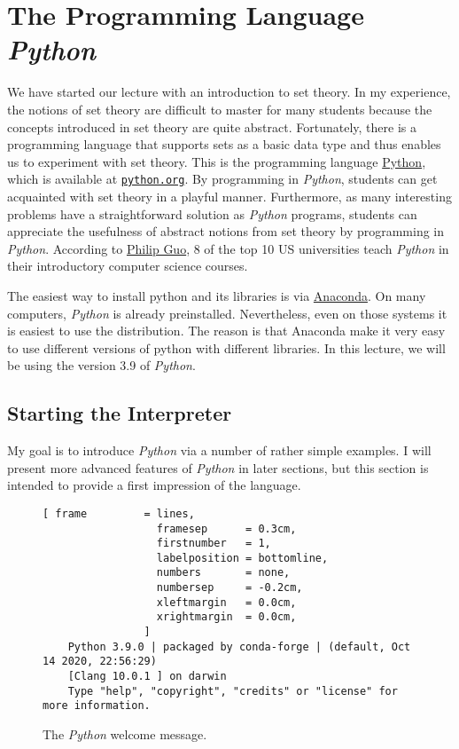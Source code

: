 \chapter{The Programming Language \textsl{Python}}
We have started our lecture with an introduction to set theory.  In my experience, the notions of
set theory are difficult to master for many students because the concepts introduced in set theory
are quite abstract.  Fortunately, there is a programming language that supports sets as a basic data type and
thus enables us to experiment with set theory.  This is the programming language
\href{https://en.wikipedia.org/wiki/Python_(programming_language)}{Python}, which is available at
\href{http://www.python.org}{\texttt{python.org}}. 
By programming in \textsl{Python}, students can get acquainted with set theory in a playful manner.
Furthermore, as many interesting problems have a straightforward solution as \textsl{Python} programs,
students can appreciate the usefulness of abstract notions from set theory by programming in \textsl{Python}.
According to 
\href{https://cacm.acm.org/blogs/blog-cacm/176450-python-is-now-the-most-popular-introductory-teaching-language-at-top-u-s-universities/fulltext}{Philip Guo},
8 of the top 10 US universities teach \textsl{Python} in their introductory computer science courses.

The easiest way to install python and its libraries is via \href{https://www.anaconda.com/download/}{Anaconda}.
On many computers, \textsl{Python} is already preinstalled.  Nevertheless, even on those systems it is easiest
to use the  distribution.  The reason is that Anaconda make it very easy to use different
versions of python with different libraries.  In this lecture, we will be using the version 3.9 of \textsl{Python}.

\section{Starting the Interpreter}
My goal is to introduce \textsl{Python} via a number of rather simple examples.  I will present more
advanced features of \textsl{Python} in later sections, but this section is intended to provide a first
impression of the language.


\begin{figure}[!ht]
\centering
\begin{Verbatim}[ frame         = lines, 
                  framesep      = 0.3cm, 
                  firstnumber   = 1,
                  labelposition = bottomline,
                  numbers       = none,
                  numbersep     = -0.2cm,
                  xleftmargin   = 0.0cm,
                  xrightmargin  = 0.0cm,
                ]
    Python 3.9.0 | packaged by conda-forge | (default, Oct 14 2020, 22:56:29) 
    [Clang 10.0.1 ] on darwin
    Type "help", "copyright", "credits" or "license" for more information.
\end{Verbatim}
\vspace*{-0.3cm}
\caption{The \textsl{Python} welcome message.}
\label{fig:python}
\end{figure}

